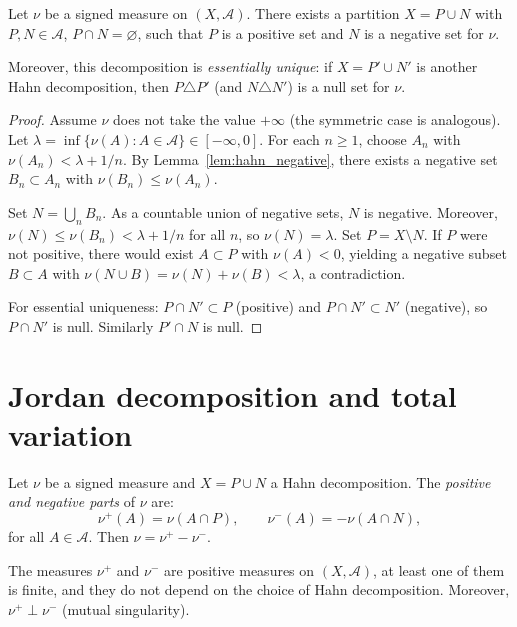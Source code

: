 \begin{theorem}
\label{thm:hahn}
Let $\nu$ be a signed measure on $(X, \mathcal{A})$. There exists a partition
$X = P \cup N$ with $P, N \in \mathcal{A}$, $P \cap N = \varnothing$, such that
$P$ is a positive set and $N$ is a negative set for $\nu$.

Moreover, this decomposition is \emph{essentially unique}: if $X = P' \cup N'$ is
another Hahn decomposition, then $P \triangle P'$ (and $N \triangle N'$) is a null
set for $\nu$.
\end{theorem}

\begin{proof}
Assume $\nu$ does not take the value $+\infty$ (the symmetric case is analogous).
Let $\lambda = \inf\{\nu(A) : A \in \mathcal{A}\} \in [-\infty, 0]$. For each
$n \geq 1$, choose $A_n$ with $\nu(A_n) < \lambda + 1/n$. By
Lemma~\ref{lem:hahn_negative}, there exists a negative set $B_n \subset A_n$ with
$\nu(B_n) \leq \nu(A_n)$.

Set $N = \bigcup_n B_n$. As a countable union of negative sets, $N$ is negative.
Moreover, $\nu(N) \leq \nu(B_n) < \lambda + 1/n$ for all $n$, so $\nu(N) = \lambda$.
Set $P = X \setminus N$. If $P$ were not positive, there would exist $A \subset P$
with $\nu(A) < 0$, yielding a negative subset $B \subset A$ with
$\nu(N \cup B) = \nu(N) + \nu(B) < \lambda$, a contradiction.

For essential uniqueness: $P \cap N' \subset P$ (positive) and $P \cap N' \subset N'$
(negative), so $P \cap N'$ is null. Similarly $P' \cap N$ is null.
\end{proof}

\section{Jordan decomposition and total variation}

\begin{definition}
\label{def:jordan}
Let $\nu$ be a signed measure and $X = P \cup N$ a Hahn decomposition. The
\emph{positive and negative parts} of $\nu$ are:
\[
    \nu^+(A) = \nu(A \cap P), \qquad \nu^-(A) = -\nu(A \cap N),
\]
for all $A \in \mathcal{A}$. Then $\nu = \nu^+ - \nu^-$.
\end{definition}

\begin{theorem}
The measures $\nu^+$ and $\nu^-$ are positive measures on $(X, \mathcal{A})$, at
least one of them is finite, and they do not depend on the choice of Hahn
decomposition. Moreover, $\nu^+ \perp \nu^-$ (mutual singularity).
\end{theorem}

